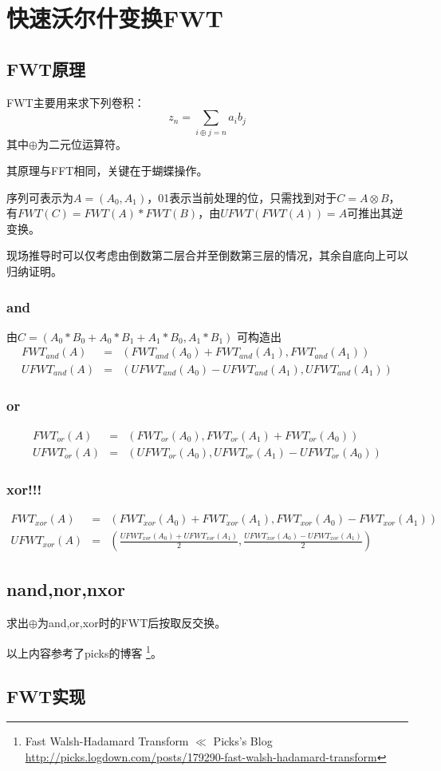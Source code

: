 \section{快速沃尔什变换FWT}
\subsection{FWT原理}
FWT主要用来求下列卷积：
\begin{displaymath}
    z_n=\sum_{i\oplus j=n}{a_ib_j}
\end{displaymath}
其中$\oplus$为二元位运算符。

其原理与FFT相同，关键在于蝴蝶操作。

序列可表示为$A=(A_0,A_1)$，01表示当前处理的位，只需找到对于$C=A\otimes B$，
有$FWT(C)=FWT(A)*FWT(B)$，由$UFWT(FWT(A))=A$可推出其逆变换。


现场推导时可以仅考虑由倒数第二层合并至倒数第三层的情况，其余自底向上可以归纳证明。

\subsubsection{and}
由$C=(A_0*B_0+A_0*B_1+A_1*B_0,A_1*B_1)$
可构造出
\begin{eqnarray*}
    FWT_{and}(A)&=&(FWT_{and}(A_0)+FWT_{and}(A_1),FWT_{and}(A_1))\\
    UFWT_{and}(A)&=&(UFWT_{and}(A_0)-UFWT_{and}(A_1),UFWT_{and}(A_1))
\end{eqnarray*}
\subsubsection{or}
\begin{eqnarray*}
    FWT_{or}(A)&=&(FWT_{or}(A_0),FWT_{or}(A_1)+FWT_{or}(A_0))\\
    UFWT_{or}(A)&=&(UFWT_{or}(A_0),UFWT_{or}(A_1)-UFWT_{or}(A_0))
\end{eqnarray*}
\subsubsection{xor!!!}
\begin{eqnarray*}
    FWT_{xor}(A)&=&(FWT_{xor}(A_0)+FWT_{xor}(A_1),FWT_{xor}(A_0)-FWT_{xor}(A_1))\\
    UFWT_{xor}(A)&=&\left(\frac{UFWT_{xor}(A_0)+UFWT_{xor}(A_1)}{2},
    \frac{UFWT_{xor}(A_0)-UFWT_{xor}(A_1)}{2}\right)
\end{eqnarray*}
\subsection{nand,nor,nxor}
求出$\oplus$为and,or,xor时的FWT后按取反交换。

以上内容参考了picks的博客
\footnote{Fast Walsh-Hadamard Transform $\ll$ Picks's Blog
    \url{http://picks.logdown.com/posts/179290-fast-walsh-hadamard-transform}}。
\subsection{FWT实现}

